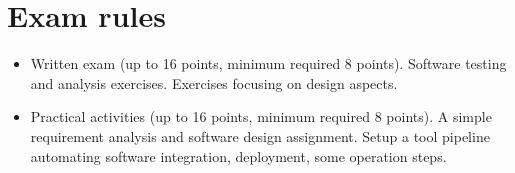 \section*{Exam rules}

\begin{itemize}
	\item Written exam (up to 16 points, minimum required 8 points). Software testing and analysis exercises. Exercises focusing on design aspects.
	\item Practical activities (up to 16 points, minimum required 8 points). A simple requirement analysis and software design assignment. Setup a tool pipeline automating software integration, deployment, some operation steps.
\end{itemize}



